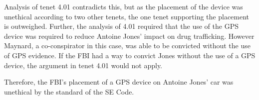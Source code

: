 \documentclass[12pt]{article}
\begin{document}
\begin{multicols}{2}
Analysis of tenet 4.01 contradicts this, but as the placement of the device was unethical according to two other tenets, the one tenet supporting the placement is outweighed.
Further, the analysis of 4.01 required that the use of the GPS device was required to reduce Antoine Jones' impact on drug trafficking. 
However Maynard, a co-conspirator in this case, was able to be convicted without the use of GPS evidence. \cite{maynarddecision}
If the FBI had a way to convict Jones without the use of a GPS device, the argument in tenet 4.01 would not apply.

Therefore, the FBI's placement of a GPS device on Antoine Jones' car was unethical by the standard of the SE Code.

\end{multicols}





\end{document}
